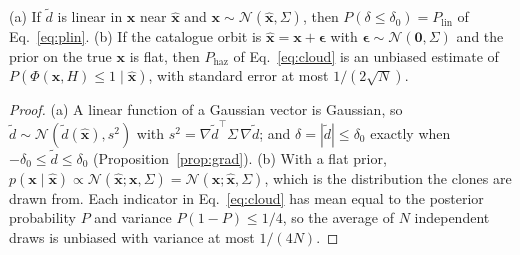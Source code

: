 \documentclass[make,article,submit,moreauthors]{Definitions/mdpi}
\begin{document}
\begin{Proposition}\label{prop:prob}
(a) If $\tilde d$ is linear in $\mathbf{x}$ near $\hat{\mathbf{x}}$ and $\mathbf{x} \sim \mathcal{N}(\hat{\mathbf{x}}, \Sigma)$, then $P(\delta \le \delta_0) = P_{\mathrm{lin}}$ of Eq.~\eqref{eq:plin}. (b) If the catalogue orbit is $\hat{\mathbf{x}} = \mathbf{x} + \boldsymbol\epsilon$ with $\boldsymbol\epsilon \sim \mathcal{N}(\mathbf{0}, \Sigma)$ and the prior on the true $\mathbf{x}$ is flat, then $P_{\mathrm{haz}}$ of Eq.~\eqref{eq:cloud} is an unbiased estimate of $P(\Phi(\mathbf{x}, H) \le 1 \mid \hat{\mathbf{x}})$, with standard error at most $1/(2\sqrt{N})$.
\end{Proposition}
\begin{proof}
(a) A linear function of a Gaussian vector is Gaussian, so $\tilde d \sim \mathcal{N}(\tilde d(\hat{\mathbf{x}}), s^2)$ with $s^2 = \nabla\tilde d^{\top}\Sigma\,\nabla\tilde d$; and $\delta = |\tilde d| \le \delta_0$ exactly when $-\delta_0 \le \tilde d \le \delta_0$ (Proposition~\ref{prop:grad}). (b) With a flat prior, $p(\mathbf{x} \mid \hat{\mathbf{x}}) \propto \mathcal{N}(\hat{\mathbf{x}}; \mathbf{x}, \Sigma) = \mathcal{N}(\mathbf{x}; \hat{\mathbf{x}}, \Sigma)$, which is the distribution the clones are drawn from. Each indicator in Eq.~\eqref{eq:cloud} has mean equal to the posterior probability $P$ and variance $P(1 - P) \le 1/4$, so the average of $N$ independent draws is unbiased with variance at most $1/(4N)$.
\end{proof}
\end{document}
